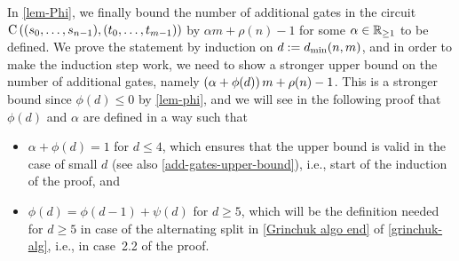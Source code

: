 In \cref{lem-Phi}, we finally bound the number of additional gates
in the circuit $\operatorname{C}\left({(s_0, \dotsc, s_{n-1}), (t_0,
\dotsc, t_{m-1})}\right)$ by $\alpha m + \rho(n) - 1$
for some $\alpha \in \mathbb R_{\geq 1}$ to be defined.
We prove the statement by induction on $d := d_{\min}(n, m)$,
and in order to make the induction step work,
we need to show a stronger upper bound on the number of additional gates,
namely $\left({\alpha + \phi(d)}\right) m + \rho(n) - 1$.
This is a stronger bound since $\phi(d) \leq 0$ by \cref{lem-phi},
and we will see in the following proof that $\phi(d)$ and $\alpha$ are defined
in a way such that
\begin{itemize}
 \item $\alpha + \phi(d) = 1$ for $d \leq 4$,
 which ensures that the upper bound is valid in the case of small $d$
 (see also \cref{add-gates-upper-bound}),
 i.e., start of the induction of the proof, and
 \item $\phi(d) = \phi(d-1) + \psi(d)$ for $d \geq 5$,
 which will be the definition needed for $d \geq 5$
 in case of the alternating split in \cref{Grinchuk algo end} of \cref{grinchuk-alg},
 i.e., in case~2.2 of the proof.
\end{itemize}

